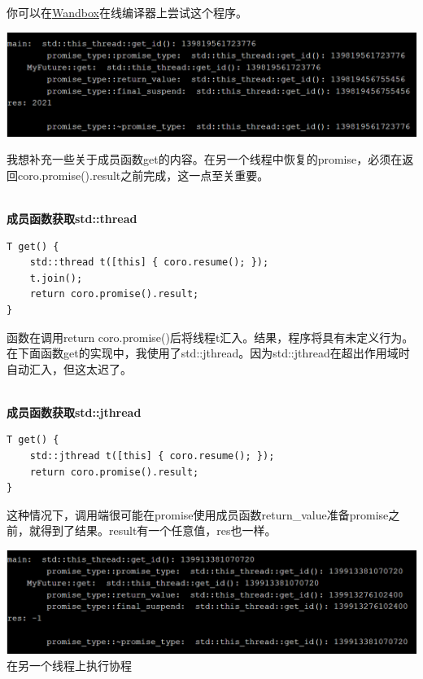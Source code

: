 你可以在\href{https://wandbox.org/permlink/jFVVj80Gxu6bnNkc}{Wandbox}在线编译器上尝试这个程序。

\begin{center}
\includegraphics[width=1.0\textwidth]{content/3/chapter7/images/11.png}\\
\end{center}

我想补充一些关于成员函数get的内容。在另一个线程中恢复的promise，必须在返回coro.promise().result之前完成，这一点至关重要。

\hspace*{\fill} \\ %
\noindent
\textbf{成员函数获取std::thread}
\begin{lstlisting}[style=styleCXX]
T get() {
	std::thread t([this] { coro.resume(); });
	t.join();
	return coro.promise().result;
}
\end{lstlisting}

函数在调用return coro.promise()后将线程t汇入。结果，程序将具有未定义行为。在下面函数get的实现中，我使用了std::jthread。因为std::jthread在超出作用域时自动汇入，但这太迟了。

\hspace*{\fill} \\ %
\noindent
\textbf{成员函数获取std::jthread}
\begin{lstlisting}[style=styleCXX]
T get() {
	std::jthread t([this] { coro.resume(); });
	return coro.promise().result;
}
\end{lstlisting}

这种情况下，调用端很可能在promise使用成员函数return\_value准备promise之前，就得到了结果。result有一个任意值，res也一样。

\begin{center}
\includegraphics[width=1.0\textwidth]{content/3/chapter7/images/12.png}\\
在另一个线程上执行协程
\end{center}

